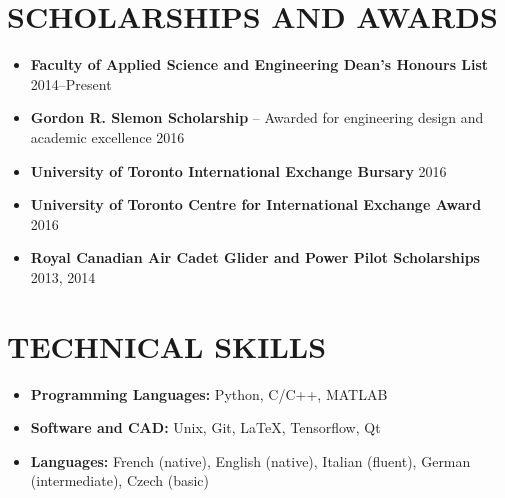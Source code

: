 \documentclass{ResumeTemplate}
\begin{document}
	\section{SCHOLARSHIPS AND AWARDS}	
	\begin{itemize}[noitemsep, leftmargin=*]
		\item \textbf{Faculty of Applied Science and Engineering Dean's Honours List} \hfill 2014--Present
		\item \textbf{Gordon R. Slemon Scholarship} -- Awarded for engineering design and academic excellence \hfill 2016
		\item \textbf{University of Toronto International Exchange Bursary} \hfill 2016
		\item \textbf{University of Toronto Centre for International Exchange Award} \hfill 2016
		\item \textbf{Royal Canadian Air Cadet Glider and Power Pilot Scholarships} \hfill 2013, 2014\vspace*{-\baselineskip}
	\end{itemize}
	
	\section{TECHNICAL SKILLS}
	\raggedright
	\begin{itemize}[noitemsep, leftmargin=*]
		\item \textbf{Programming Languages:} Python, C/C++,  MATLAB \\
		\item \textbf{Software and CAD:} Unix, Git, LaTeX, Tensorflow, Qt\\
		\item \textbf{Languages:} French (native),  English (native),  Italian (fluent),  German (intermediate), Czech (basic)\vspace*{-\baselineskip}
	\end{itemize}
\end{document}
